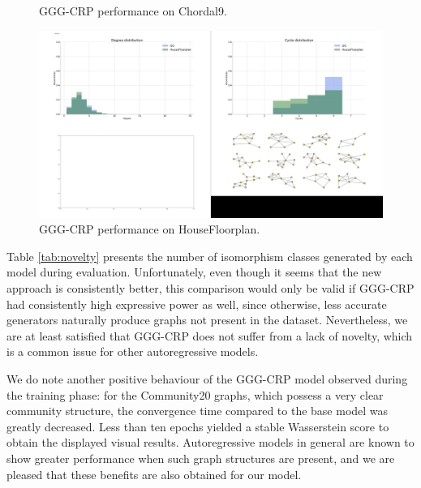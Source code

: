\begin{figure}[!ht]
\begin{minipage}{0.475\textwidth}
    \caption{GGG-CRP performance on Chordal9.}
    \label{fig:chordal9}    
    \end{minipage}
    \hfill
    \begin{minipage}{0.475\textwidth}
    \centering
    \includegraphics[width=\textwidth]{figures/gggcrp/Housefloorplan.pdf}
    \caption{GGG-CRP performance on HouseFloorplan.}
    \label{fig:house}    
    \end{minipage}
\end{figure}
Table \ref{tab:novelty} presents the number of isomorphism classes generated by each model during evaluation. Unfortunately, even though it seems that the new approach is consistently better, this comparison would only be valid if GGG-CRP had consistently high expressive power as well, since otherwise, less accurate generators naturally produce graphs not present in the dataset. Nevertheless, we are at least satisfied that GGG-CRP does not suffer from a lack of novelty, which is a common issue for other autoregressive models.
\begin{table}[H]
\centering
\caption[Comparison of novelty and diversity between GG-GAN and GGG-CRP.]{Comparison of novelty and diversity between GG-GAN and GGG-CRP. A higher number of isomorphism classes denotes better performance.}
\label{tab:novelty}
\end{table}
We do note another positive behaviour of the GGG-CRP model observed during the training phase: for the Community20 graphs, which possess a very clear community structure, the convergence time compared to the base model was greatly decreased. Less than ten epochs yielded a stable Wasserstein score to obtain the displayed visual results. Autoregressive models in general are known to show greater performance when such graph structures are present, and we are pleased that these benefits are also obtained for our model.

